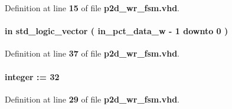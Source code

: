Definition at line {\bf 15} of file {\bf p2d\+\_\+wr\+\_\+fsm.\+vhd}.

\paragraph[{in\+\_\+pct\+\_\+data}]{ {\bfseries \textcolor{keywordflow}{in}\textcolor{vhdlchar}{ }} {\bfseries \textcolor{comment}{std\+\_\+logic\+\_\+vector}\textcolor{vhdlchar}{ }\textcolor{vhdlchar}{(}\textcolor{vhdlchar}{ }\textcolor{vhdlchar}{ }\textcolor{vhdlchar}{ }\textcolor{vhdlchar}{ }{\bfseries {\bf in\+\_\+pct\+\_\+data\+\_\+w}} \textcolor{vhdlchar}{-\/}\textcolor{vhdlchar}{ } \textcolor{vhdldigit}{1} \textcolor{vhdlchar}{ }\textcolor{keywordflow}{downto}\textcolor{vhdlchar}{ }\textcolor{vhdlchar}{ } \textcolor{vhdldigit}{0} \textcolor{vhdlchar}{ }\textcolor{vhdlchar}{)}\textcolor{vhdlchar}{ }} \hspace{0.3cm}{\ttfamily [Port]}}\label{classp2d__wr__fsm_aedf5f7fe5cea9eafd5e8a7b477065c1c}


Definition at line {\bf 37} of file {\bf p2d\+\_\+wr\+\_\+fsm.\+vhd}.

\paragraph[{in\+\_\+pct\+\_\+data\+\_\+w}]{ {\bfseries \textcolor{vhdlchar}{ }} {\bfseries \textcolor{comment}{integer}\textcolor{vhdlchar}{ }\textcolor{vhdlchar}{ }\textcolor{vhdlchar}{\+:}\textcolor{vhdlchar}{=}\textcolor{vhdlchar}{ }\textcolor{vhdlchar}{ } \textcolor{vhdldigit}{32} \textcolor{vhdlchar}{ }} \hspace{0.3cm}{\ttfamily [Generic]}}\label{classp2d__wr__fsm_a95676500d5b1dd663594499d9fcca396}


Definition at line {\bf 29} of file {\bf p2d\+\_\+wr\+\_\+fsm.\+vhd}.


